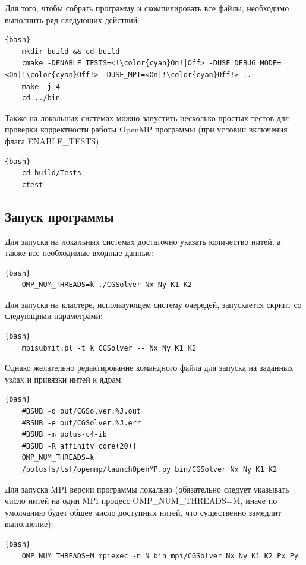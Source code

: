 \documentclass[12pt, a4paper]{article}
\begin{document}
Для того, чтобы собрать программу и скомпилировать все файлы, необходимо выполнить ряд следующих действий:

\begin{lstlisting}[escapechar=!]{bash}
	mkdir build && cd build
	cmake -DENABLE_TESTS=<!\color{cyan}On!|Off> -DUSE_DEBUG_MODE=<On|!\color{cyan}Off!> -DUSE_MPI=<On|!\color{cyan}Off!> ..
	make -j 4
	cd ../bin
\end{lstlisting}

Также на локальных системах можно запустить несколько простых тестов для проверки корректности работы OpenMP программы (при условии включения флага ENABLE\_TESTS):

\begin{lstlisting}{bash}
	cd build/Tests
	ctest
\end{lstlisting}

\subsection{Запуск программы}

Для запуска на локальных системах достаточно указать количество нитей, а также все необходимые входные данные:

\begin{lstlisting}{bash}
	OMP_NUM_THREADS=k ./CGSolver Nx Ny K1 K2
\end{lstlisting}

Для запуска на кластере, использующем систему очередей, запускается скрипт со следующими параметрами:

\begin{lstlisting}{bash}
	mpisubmit.pl -t k CGSolver -- Nx Ny K1 K2
\end{lstlisting}

Однако желательно редактирование командного файла для запуска на заданных узлах и привязки нитей к ядрам.

\begin{lstlisting}{bash}
	#BSUB -o out/CGSolver.%J.out
	#BSUB -e out/CGSolver.%J.err
	#BSUB -m polus-c4-ib
	#BSUB -R affinity[core(20)]
	OMP_NUM_THREADS=k
	/polusfs/lsf/openmp/launchOpenMP.py bin/CGSolver Nx Ny K1 K2
\end{lstlisting}

Для запуска MPI версии программы локально (обязательно следует указывать число нитей на один MPI процесс OMP\_NUM\_THREADS=M, иначе по умолчанию будет общее число доступных нитей, что существенно замедлит выполнение):

\begin{lstlisting}{bash}
	OMP_NUM_THREADS=M mpiexec -n N bin_mpi/CGSolver Nx Ny K1 K2 Px Py
\end{lstlisting}
\end{document}
